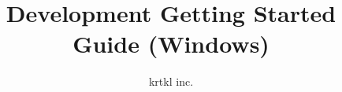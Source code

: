 
%
%
\title{Development Getting Started Guide (Windows)}
\author{krtkl inc.}

\makeatletter




	\maketitle

	
	
	



